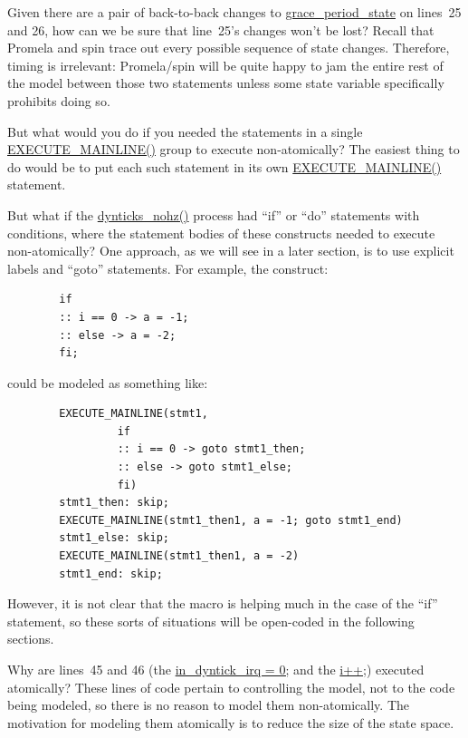 \QuickQ{}
	Given there are a pair of back-to-back changes to
	\url{grace_period_state} on lines~25 and 26,
	how can we be sure that line~25's changes won't be lost?
\QuickA{}
	Recall that Promela and spin trace out
	every possible sequence of state changes.
	Therefore, timing is irrelevant: Promela/spin will be quite
	happy to jam the entire rest of the model between those two
	statements unless some state variable specifically prohibits
	doing so.

\QuickQ{}
	But what would you do if you needed the statements in a single
	\url{EXECUTE_MAINLINE()} group to execute non-atomically?
\QuickA{}
	The easiest thing to do would be to put
	each such statement in its own \url{EXECUTE_MAINLINE()}
	statement.

\QuickQ{}
	But what if the \url{dynticks_nohz()} process had
	``if'' or ``do'' statements with conditions,
	where the statement bodies of these constructs
	needed to execute non-atomically?
\QuickA{}
	One approach, as we will see in a later section,
	is to use explicit labels and ``goto'' statements.
	For example, the construct:

	\vspace{5pt}
	\begin{minipage}[t]{\columnwidth}
	\scriptsize
	\begin{verbatim}
		if
		:: i == 0 -> a = -1;
		:: else -> a = -2;
		fi;
	\end{verbatim}
	\end{minipage}
	\vspace{5pt}

	could be modeled as something like:

	\vspace{5pt}
	\begin{minipage}[t]{\columnwidth}
	\scriptsize
	\begin{verbatim}
		EXECUTE_MAINLINE(stmt1,
				 if
				 :: i == 0 -> goto stmt1_then;
				 :: else -> goto stmt1_else;
				 fi)
		stmt1_then: skip;
		EXECUTE_MAINLINE(stmt1_then1, a = -1; goto stmt1_end)
		stmt1_else: skip;
		EXECUTE_MAINLINE(stmt1_then1, a = -2)
		stmt1_end: skip;
	\end{verbatim}
	\end{minipage}
	\vspace{5pt}

	However, it is not clear that the macro is helping much in the case
	of the ``if'' statement, so these sorts of situations will
	be open-coded in the following sections.

\QuickQ{}
	Why are lines~45 and 46 (the \url{in_dyntick_irq = 0;}
	and the \url{i++;}) executed atomically?
\QuickA{}
	These lines of code pertain to controlling the
	model, not to the code being modeled, so there is no reason to
	model them non-atomically.
	The motivation for modeling them atomically is to reduce the size
	of the state space.

